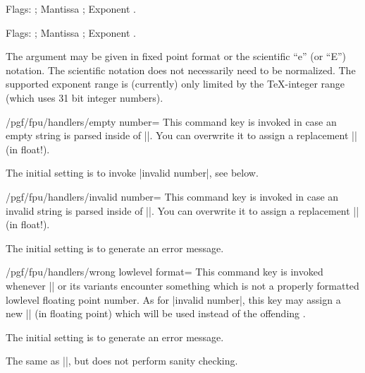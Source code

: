 \begin{command}{\pgfmathfloatparsenumber{}}
\begin{codeexample}[]
\pgfmathfloattomacro{\pgfmathresult}{\F}{\M}{\E}
Flags: \F; Mantissa \M; Exponent \E.
\end{codeexample}

\begin{codeexample}[]
\pgfmathfloattomacro{\pgfmathresult}{\F}{\M}{\E}
Flags: \F; Mantissa \M; Exponent \E.
\end{codeexample}
  The argument  may be given in fixed point format or the
  scientific ``e'' (or ``E'') notation. The scientific notation does not
  necessarily need to be normalized. The supported exponent range is
  (currently) only limited by the \TeX-integer range (which uses 31
  bit integer numbers). 
\end{command}

\begin{key}{/pgf/fpu/handlers/empty number=}
  This command key is invoked in case an empty string is parsed inside
  of |\pgfmathfloatparsenumber|. You can overwrite it to assign a
  replacement |\pgfmathresult| (in float!). 

  The initial setting is to invoke |invalid number|, see below.
\end{key}
\begin{key}{/pgf/fpu/handlers/invalid number=}
  This command key is invoked in case an invalid string is parsed
  inside of |\pgfmathfloatparsenumber|. You can overwrite it to assign
  a replacement |\pgfmathresult| (in float!). 

  The initial setting is to generate an error message.
\end{key}
\begin{key}{/pgf/fpu/handlers/wrong lowlevel format=}
  This command key is invoked whenever |\pgfmathfloattoregisters| or
  its variants encounter something which is not a properly formatted
  lowlevel floating point number. As for |invalid number|, this key
  may assign a new |\pgfmathresult| (in floating point) which will be
  used instead of the offending . 

  The initial setting is to generate an error message.
\end{key}

\begin{command}{\pgfmathfloatqparsenumber{}}
  The same as |\pgfmathfloatparsenumber|, but does not perform sanity checking.
\end{command}

